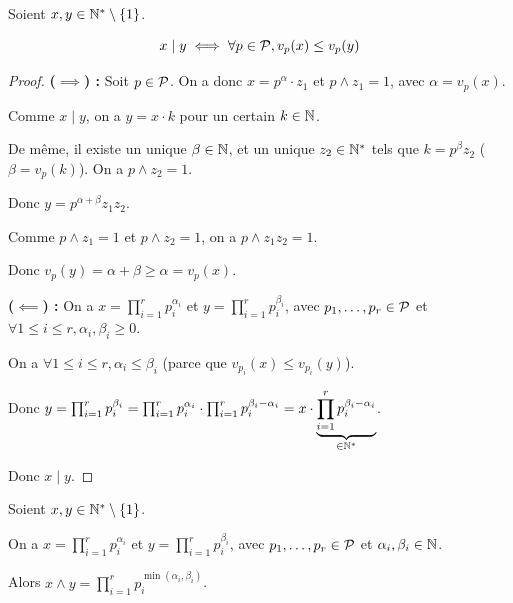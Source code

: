 \documentclass[12pt,a4paper]{report}
\begin{document}
\begin{property}
    Soient $x,y \in \mathbb{N}^*\setminus\{1\}$.

    $$x\mid y \iff \forall p \in \mathcal{P}, v_p(x) \le v_p(y)$$
\end{property}

\begin{proof}
    \textbf{($\implies$) :} Soit $p \in \mathcal{P}$. On a donc $x = p^\alpha \cdot z_1$ et $p\wedge z_1 = 1$, avec $\alpha = v_p(x)$.

    Comme $x \mid y$, on a $y = x \cdot k$ pour un certain $k \in \mathbb{N}$.

    De même, il existe un unique $\beta \in \mathbb{N}$, et un unique $z_2 \in \mathbb{N}^*$ tels que $k=p^\beta z_2$ ($\beta = v_p(k)$). On a $p \wedge z_2 = 1$.

    Donc $y = p^{\alpha + \beta} z_1 z_2$.

    Comme $p \wedge z_1 = 1$ et $p \wedge z_2 = 1$, on a $p \wedge z_1 z_2 = 1$.

    Donc $v_p(y) = \alpha + \beta \ge \alpha = v_p(x)$.

    \textbf{($\impliedby$) :} On a $x = \prod_{i = 1}^r p_i^{\alpha_i}$ et $y = \prod_{i=1}^r p_i^{\beta_i}$, avec $p_1,\dots,p_r \in \mathcal{P}$ et $\forall 1 \le i \le r, \alpha_i, \beta_i \ge 0$.

    On a $\forall 1 \le i \le r, \alpha_i \le \beta_i$ (parce que $v_{p_i}(x) \le v_{p_i}(y)$).

    Donc $y = \prod_{i=1}^r p_i^{\beta_i} = \prod_{i=1}^r p_i^{\alpha_i} \cdot \prod_{i=1}^r p_i^{\beta_i - \alpha_i} = x \cdot \underbrace{\prod_{i=1}^r p_i^{\beta_i - \alpha_i}}_{\in \mathbb{N}^*}$.

    Donc $x \mid y$.
\end{proof}

\begin{theorem}
    Soient $x,y \in \mathbb{N}^*\setminus\{1\}$.

    On a $x = \prod_{i=1}^r p_i^{\alpha_i}$ et $y = \prod_{i=1}^r p_i^{\beta_i}$, avec $p_1,\dots,p_r \in \mathcal{P}$ et $\alpha_i, \beta_i \in \mathbb{N}$.

    Alors $x \wedge y = \prod_{i=1}^r p_i^{\min(\alpha_i,\beta_i)}$.
\end{theorem}
\end{document}
